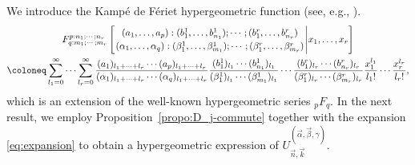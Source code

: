\documentclass[11pt,reqno]{amsart}
\newcommand{\KF}[5]{F^{#1}_{#2}\left[{#3\atop #4}\Bigg\vert #5\right]}
\theoremstyle{definition}
\begin{document}
We introduce the Kampé de Fériet hypergeometric function (see, e.g., \citep{AK26, Lau1893}).
\begin{multline}
	\label{MKF}
	\KF{p:n_1;\cdots;n_r}{q:m_1;\cdots;m_r}{(a_1,\ldots,a_p):(b^1_1,\ldots,b^1_{n_1});\cdots;(b^r_1,\ldots,b^r_{n_r})}{(\alpha_1,\ldots,\alpha_q):(\beta^1_1,\ldots,\beta^1_{m_1});\cdots;(\beta^r_1,\ldots,\beta^r_{m_r})}{x_1,\ldots,x_r}\\
	\coloneq\sum_{l_1=0}^{\infty}\cdots\sum_{l_r=0}^{\infty}\dfrac{(a_1)_{l_1+\cdots+l_r}\cdots(a_p)_{l_1+\cdots+l_r}}{(\alpha_1)_{l_1+\cdots+l_r}\cdots(\alpha_q)_{l_1+\cdots+l_r}}\dfrac{(b^1_1)_{l_1}\cdots(b^1_{n_1})_{l_1}}{(\beta^1_1)_{l_1}\cdots(\beta^1_{m_1})_{l_1}}\cdots\dfrac{(b^r_1)_{l_r}\cdots(b^r_{n_r})_{l_r}}{(\beta^r_1)_{l_r}\cdots(\beta^r_{m_r})_{l_r}}\dfrac{x_1^{l_1}}{l_1!}\cdots\dfrac{x_r^{l_r}}{l_r!},
\end{multline}
which is an extension of the well-known hypergeometric series ${}_p F_q$. In the next result, we employ Proposition~\ref{propo:D_j-commute} together with the expansion \eqref{eq:expansion} to obtain a hypergeometric expression of $U_{\vec n,\vec k}^{(\vec\alpha,\vec\beta,\gamma)}$.
\end{document}
